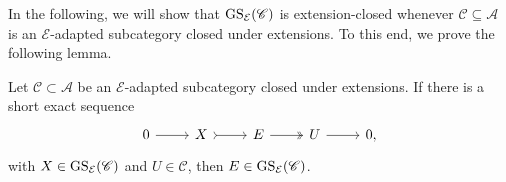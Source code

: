 In the following, we will show that $\operatorname{GS}_\mathcal{E}(\mathscr{C})$ is extension-closed whenever $\mathscr{C} \subseteq \mathscr{A}$ is an $\mathcal{E}$-adapted subcategory closed under extensions. To this end, we prove the following lemma.

\begin{lemma}
\label{lemmaExtclosedinduction}
Let $\mathscr{C} \subset \mathscr{A}$ be an $\mathcal{E}$-adapted subcategory closed under extensions. If there is a short exact sequence 
\[\begin{tikzcd}
	0 & X & E  & U &  0,
	\arrow[from=1-1, to=1-2]
	\arrow[tail, from=1-2, to=1-3]
	\arrow[two heads,from=1-3, to=1-4]
	\arrow[from=1-4, to=1-5]
\end{tikzcd} \] with $X \in \operatorname{GS}_{\mathcal{E}}(\mathscr{C})$ and $U \in \mathscr{C}$, then $E \in \operatorname{GS}_{\mathcal{E}}(\mathscr{C})$.
\end{lemma}

